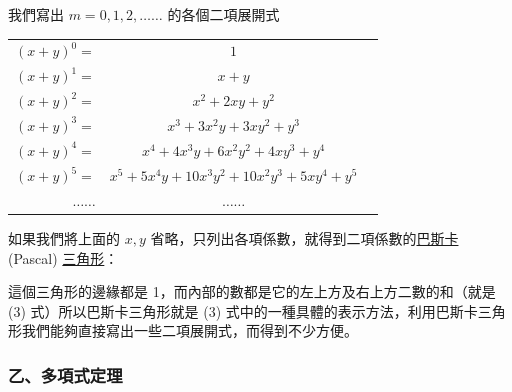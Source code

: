 我們寫出 $m = 0, 1, 2, \dots\dots$ 的各個二項展開式
\begin{center}
\begin{tabular}{rcc}
$(x + y)^0 =$ & $1$ \\
$(x + y)^1 =$ & $x + y$ \\
$(x + y)^2 =$ & $x^2 + 2xy + y^2$ \\
$(x + y)^3 =$ & $x^3 + 3x^2 y + 3xy^2 + y^3$ \\
$(x + y)^4 =$ & $x^4 + 4x^3 y + 6x^2 y^2 + 4xy^3 + y^4$ \\
$(x + y)^5 =$ & $x^5 + 5x^4 y + 10x^3 y^2 + 10x^2 y^3 + 5xy^4 + y^5$ \\
$\dots\dots$ & $\dots\dots$
\end{tabular}
\end{center}
如果我們將上面的 $x, y$ 省略，只列出各項係數，就得到二項係數的\underline{巴斯卡} (Pascal) \underline{三角形}：

\begin{center}
\end{center}

這個三角形的邊緣都是 1，而內部的數都是它的左上方及右上方二數的和（就是 (3) 式）所以巴斯卡三角形就是 (3) 式中的一種具體的表示方法，利用巴斯卡三角形我們能夠直接寫出一些二項展開式，而得到不少方便。

\subsubsection*{乙、多項式定理}\label{subsec:b5s-2-4-b}

